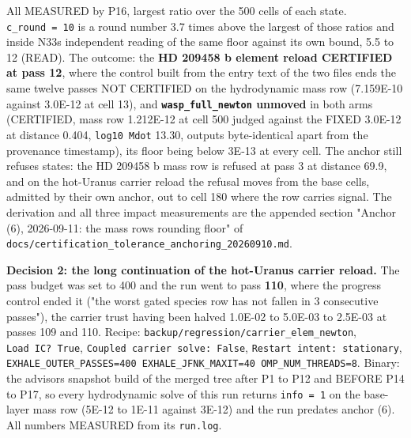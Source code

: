 \documentclass[english,a4paper]{my_memo}
\begin{document}
All MEASURED by P16, largest ratio over the 500 cells of each state. \texttt{c\_round\ =\ 10} is a round number 3.7 times above the largest of those ratios and inside
N33\textquotesingle s independent reading of the same floor against its own bound, 5.5 to 12
(READ). The outcome: the \textbf{HD 209458 b element reload CERTIFIED at pass 12},
where the control built from the entry text of the two files ends the same
twelve passes NOT CERTIFIED on the hydrodynamic mass row (7.159E-10 against
3.0E-12 at cell 13), and \textbf{\texttt{wasp\_full\_newton} unmoved} in both arms
(CERTIFIED, mass row 1.212E-12 at cell 500 judged against the FIXED 3.0E-12 at
distance 0.404, \texttt{log10\ Mdot} 13.30, outputs byte-identical apart from the
provenance timestamp), its floor being below 3E-13 at every cell. The anchor
still refuses states: the HD 209458 b mass row is refused at pass 3 at distance
69.9, and on the hot-Uranus carrier reload the refusal moves from the base
cells, admitted by their own anchor, out to cell 180 where the row carries
signal. The derivation and all three impact measurements are the appended
section "Anchor (6), 2026-09-11: the mass row\textquotesingle s rounding floor" of
\texttt{docs/certification\_tolerance\_anchoring\_20260910.md}.

\textbf{Decision 2: the long continuation of the hot-Uranus carrier reload.} The
pass budget was set to 400 and the run went to pass \textbf{110}, where the progress
control ended it ("the worst gated species row has not fallen in 3 consecutive
passes"), the carrier trust having been halved 1.0E-02 to 5.0E-03 to 2.5E-03 at
passes 109 and 110. Recipe: \texttt{backup/regression/carrier\_elem\_newton},
\texttt{Load\ IC?\ True}, \texttt{Coupled\ carrier\ solve:\ False}, \texttt{Restart\ intent:\ stationary},
\texttt{EXHALE\_OUTER\_PASSES=400\ EXHALE\_JFNK\_MAXIT=40\ OMP\_NUM\_THREADS=8}. Binary: the
advisor\textquotesingle s snapshot build of the merged tree after P1 to P12 and BEFORE P14 to
P17, so every hydrodynamic solve of this run returns \texttt{info\ =\ 1} on the
base-layer mass row (5E-12 to 1E-11 against 3E-12) and the run predates
anchor (6). All numbers MEASURED from its \texttt{run.log}.
\end{document}

